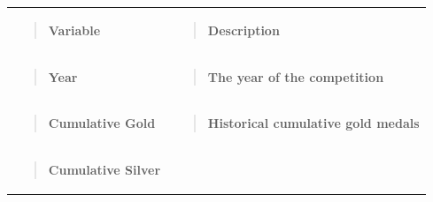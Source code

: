 \documentclass[12pt,a4paper]{article}
\renewenvironment{quote}{\begin{quotation}}{\end{quotation}}  %
\begin{document}
    \begin{longtable}[]{@{}
      >{\raggedright\arraybackslash}p{}
      >{\raggedright\arraybackslash}p{}@{}}
    \toprule\noalign{}
    \endhead
    \bottomrule\noalign{}
    \endlastfoot
    \begin{minipage}[t]{\linewidth}\raggedright
    \begin{quote}
    \textbf{Variable}
    \end{quote}
    \end{minipage} & \begin{minipage}[t]{\linewidth}\raggedright
    \begin{quote}
    \textbf{Description}
    \end{quote}
    \end{minipage} \\
    \begin{minipage}[t]{\linewidth}\raggedright
    \begin{quote}
    \textbf{Year}
    \end{quote}
    \end{minipage} & \begin{minipage}[t]{\linewidth}\raggedright
    \begin{quote}
    \textbf{The year of the competition}
    \end{quote}
    \end{minipage} \\
    \begin{minipage}[t]{\linewidth}\raggedright
    \begin{quote}
    \textbf{Cumulative Gold}
    \end{quote}
    \end{minipage} & \begin{minipage}[t]{\linewidth}\raggedright
    \begin{quote}
    \textbf{Historical cumulative gold medals}
    \end{quote}
    \end{minipage} \\
    \begin{minipage}[t]{\linewidth}\raggedright
    \begin{quote}
    \textbf{Cumulative Silver}
    \end{quote}
    \end{minipage} & \begin{minipage}[t]{\linewidth}\raggedright
    \begin{quote}

\end{quote}
\end{minipage}
\end{longtable}
\end{document}
